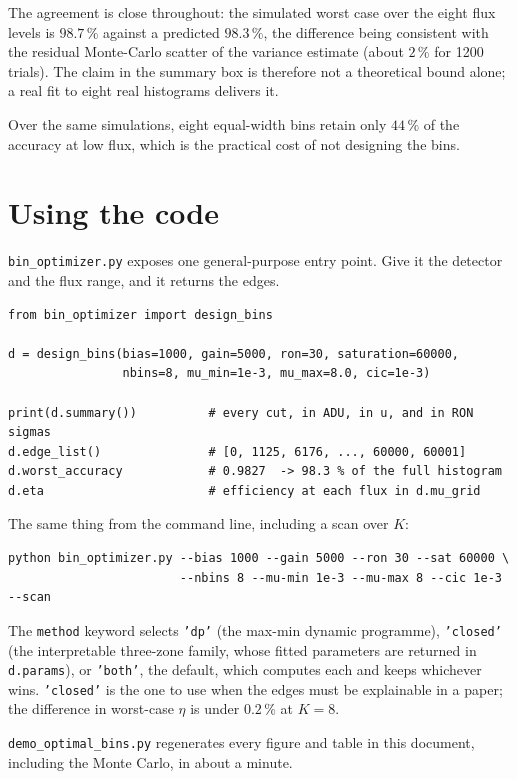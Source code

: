 \documentclass[11pt,a4paper]{article}
\begin{document}
The agreement is close throughout: the simulated worst case over the eight flux
levels is $98.7\,\%$ against a predicted $98.3\,\%$, the difference being
consistent with the residual Monte-Carlo scatter of the variance estimate
(about $2\,\%$ for 1200 trials). The claim in the summary box is therefore not
a theoretical bound alone; a real fit to eight real histograms delivers it.

Over the same simulations, eight equal-width bins retain only $44\,\%$ of the
accuracy at low flux, which is the practical cost of not designing the bins.

\section{Using the code}

\texttt{bin\_optimizer.py} exposes one general-purpose entry point. Give it the
detector and the flux range, and it returns the edges.

\begin{lstlisting}
from bin_optimizer import design_bins

d = design_bins(bias=1000, gain=5000, ron=30, saturation=60000,
                nbins=8, mu_min=1e-3, mu_max=8.0, cic=1e-3)

print(d.summary())          # every cut, in ADU, in u, and in RON sigmas
d.edge_list()               # [0, 1125, 6176, ..., 60000, 60001]
d.worst_accuracy            # 0.9827  -> 98.3 % of the full histogram
d.eta                       # efficiency at each flux in d.mu_grid
\end{lstlisting}

The same thing from the command line, including a scan over $K$:

\begin{lstlisting}
python bin_optimizer.py --bias 1000 --gain 5000 --ron 30 --sat 60000 \
                        --nbins 8 --mu-min 1e-3 --mu-max 8 --cic 1e-3 --scan
\end{lstlisting}

The \texttt{method} keyword selects \texttt{'dp'} (the max-min dynamic
programme), \texttt{'closed'} (the interpretable three-zone family, whose
fitted parameters are returned in \texttt{d.params}), or \texttt{'both'}, the
default, which computes each and keeps whichever wins. \texttt{'closed'} is the
one to use when the edges must be explainable in a paper; the difference in
worst-case $\eta$ is under $0.2\,\%$ at $K=8$.

\texttt{demo\_optimal\_bins.py} regenerates every figure and table in this
document, including the Monte Carlo, in about a minute.
\end{document}
